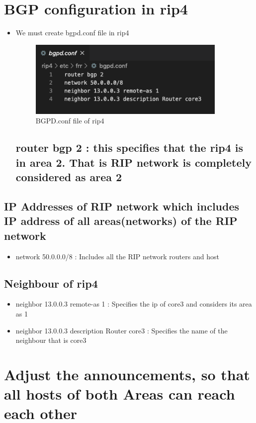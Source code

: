 \section{BGP configuration in rip4}
\begin{itemize}
    \item We must create bgpd.conf file in rip4
    \begin{figure}[H]
\centering
  \includegraphics[width=0.9\textwidth]{Images/BGPD_rip4.conf.png}
  \caption{BGPD.conf file of rip4}
  \label{fig }
\end{figure}
\subsection{ router bgp 2 : this specifies that the rip4 is in area 2. That is RIP network is completely considered as area 2}
\end{itemize}
\subsection{IP Addresses of RIP network which includes IP address of all  areas(networks) of the RIP network}
\begin{itemize}
\item network 50.0.0.0/8 : Includes all the RIP network routers and host
\end{itemize}
\subsection{Neighbour of rip4}
\begin{itemize}
\item neighbor 13.0.0.3 remote-as 1 : Specifies the ip of core3 and considers its area as 1
\item neighbor 13.0.0.3 description Router core3 : Specifies the name of the neighbour that is core3
\end{itemize}
\section{Adjust the announcements, so that all hosts of both Areas can reach each other}
